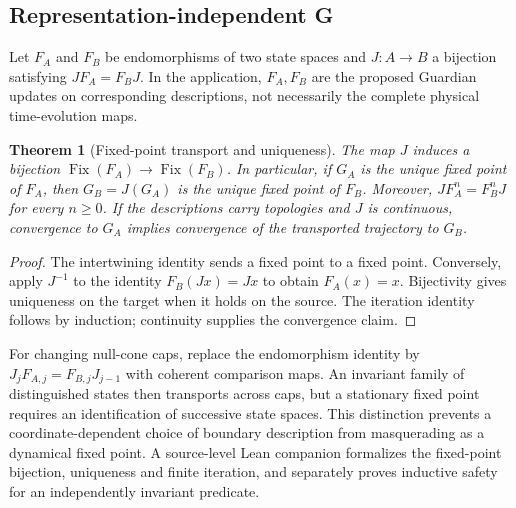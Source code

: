 \documentclass[11pt,a4paper]{article}
\newtheorem{theorem}{Theorem}[section]\newtheorem{proposition}[theorem]{Proposition}\newtheorem{definition}[theorem]{Definition}\newtheorem{example}[theorem]{Example}
\begin{document}
\subsection{Representation-independent G}
Let $F_A$ and $F_B$ be endomorphisms of two state spaces and $J:A\to B$ a bijection satisfying $JF_A=F_BJ$. In the application, $F_A,F_B$ are the proposed Guardian updates on corresponding descriptions, not necessarily the complete physical time-evolution maps.
\begin{theorem}[Fixed-point transport and uniqueness]
The map $J$ induces a bijection $\operatorname{Fix}(F_A)\to\operatorname{Fix}(F_B)$. In particular, if $G_A$ is the unique fixed point of $F_A$, then $G_B=J(G_A)$ is the unique fixed point of $F_B$. Moreover, $JF_A^n=F_B^nJ$ for every $n\geq0$. If the descriptions carry topologies and $J$ is continuous, convergence to $G_A$ implies convergence of the transported trajectory to $G_B$.
\end{theorem}
\begin{proof} The intertwining identity sends a fixed point to a fixed point. Conversely, apply $J^{-1}$ to the identity $F_B(Jx)=Jx$ to obtain $F_A(x)=x$. Bijectivity gives uniqueness on the target when it holds on the source. The iteration identity follows by induction; continuity supplies the convergence claim.\end{proof}
For changing null-cone caps, replace the endomorphism identity by $J_jF_{A,j}=F_{B,j}J_{j-1}$ with coherent comparison maps. An invariant family of distinguished states then transports across caps, but a stationary fixed point requires an identification of successive state spaces. This distinction prevents a coordinate-dependent choice of boundary description from masquerading as a dynamical fixed point. A source-level Lean companion formalizes the fixed-point bijection, uniqueness and finite iteration, and separately proves inductive safety for an independently invariant predicate.
\end{document}
